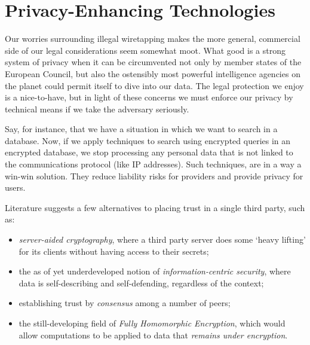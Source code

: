 \documentclass[12pt]{article}
\begin{document}



\section{Privacy-Enhancing Technologies}
\label{sec:pet}

Our worries surrounding illegal wiretapping makes the more general, commercial side of our legal considerations seem somewhat moot.
What good is a strong system of privacy when it can be circumvented not only by member states of the European Council, but also the ostensibly most powerful intelligence agencies on the planet could permit itself to dive into our data.
The legal protection we enjoy is a nice-to-have, but in light of these concerns we must enforce our privacy by technical means if we take the adversary seriously.

Say, for instance, that we have a situation in which we want to search in a database.
Now, if we apply techniques to search using encrypted queries in an encrypted database, we stop processing any personal data that is not linked to the communications protocol (like IP addresses). Such techniques, are in a way a win-win solution. They reduce liability risks for providers and provide privacy for users.


Literature suggests a few alternatives to placing trust in a single third party, such as:
\begin{itemize}
\item \textit{server-aided cryptography}, where a third party server does some `heavy lifting' for its clients without having access to their secrets;
\item the as of yet underdeveloped notion of \textit{information-centric security}, where data is self-describing and self-defending, regardless of the context; \cite{chow2009controlling}
\item establishing trust by \textit{consensus} among a number of peers;
\item the still-developing field of \textit{Fully Homomorphic Encryption}, which would allow computations to be applied to data that \textit{remains under encryption}.
\end{itemize}
\end{document}
